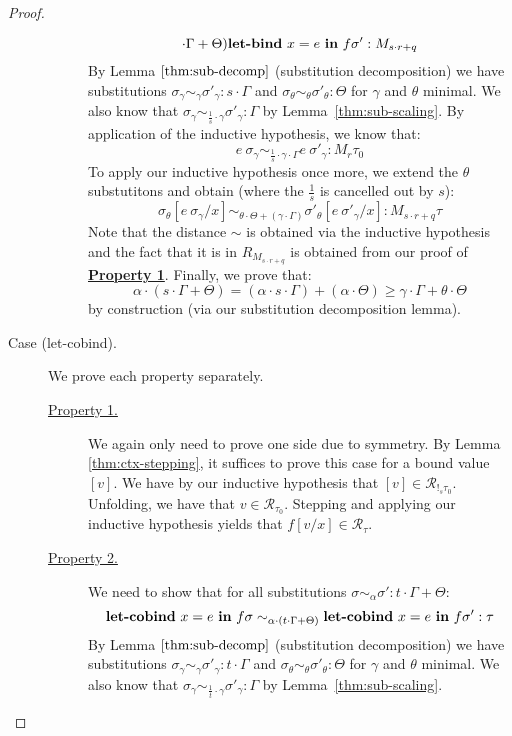 \begin{proof}
\begin{description}
\begin{description}
$${          \cdot \Gamma + \Theta)} \textbf{let-bind}~x = e \ \textbf{in} \ f \sigma' :
          M_{s \cdot r + q}$$
          By Lemma $\ref{thm:sub-decomp}$ (substitution decomposition) we have
          substitutions 
          $\sigma_{\gamma} \sim_{\gamma} \sigma'_{\gamma} : s \cdot \Gamma$
          and $\sigma_{\theta} \sim_{\theta} \sigma'_{\theta} : \Theta$ for
          $\gamma$ and $\theta$ minimal. 
          We also know that 
          $\sigma_{\gamma} \sim_{\frac{1}{s} \cdot \gamma} \sigma'_{\gamma} : \Gamma$ by
          Lemma~\ref{thm:sub-scaling}.
          By application of the inductive hypothesis, we know that:
          $$
          e~\sigma_{\gamma} \sim_{\frac{1}{s} \cdot \gamma \cdot \Gamma}
          e~\sigma'_{\gamma} : M_r \tau_0
          $$
          To apply our inductive hypothesis once more, we extend the $\theta$
          substutitons and obtain (where the $\frac{1}{s}$ is cancelled out by
          $s$):
          $$\sigma_{\theta}[e~\sigma_{\gamma}/x] \sim_{\theta \cdot \Theta + (\gamma \cdot \Gamma)}\sigma'_{\theta}[e~\sigma'_{\gamma}/x] : M_{s \cdot r + q} \tau$$
          Note that the distance $\sim$ is obtained via the inductive hypothesis
          and the fact that it is in $R_{M_{s \cdot r + q}}$ is obtained from
          our proof of \textbf{\underline{Property 1}}.
          Finally, we prove that:
          $$
          \alpha \cdot (s \cdot \Gamma + \Theta) = 
          (\alpha \cdot s \cdot \Gamma) + (\alpha \cdot \Theta)
          \geq
          \gamma \cdot \Gamma + \theta \cdot \Theta
          $$
          by construction (via our substitution decomposition lemma).
      \end{description}
    \item[Case (let-cobind).] 
      We prove each property separately.
      \begin{description}
        \item[\underline{Property 1.}]
          We again only need to prove one side due to symmetry.
          By Lemma \ref{thm:ctx-stepping}, it suffices to prove this case for a
          bound value $[v]$. 
          We have by our inductive hypothesis that $[v] \in \mathcal{R}_{!_s \tau_0}$.
          Unfolding, we have that $v \in \mathcal{R}_{\tau_0}$.
          Stepping and applying our inductive hypothesis yields that $f[v/x] \in
          \mathcal{R}_{\tau}$.
        \item[\underline{Property 2.}]
          We need to show that for all substitutions $\sigma \sim_{\alpha}
          \sigma' : t \cdot \Gamma + \Theta$:
          $$\textbf{let-cobind}~x = e \ \textbf{in} \ f \sigma \sim_{\alpha \cdot (t
          \cdot \Gamma + \Theta)} \textbf{let-cobind}~x = e \ \textbf{in} \ f \sigma' :
          \tau$$
          By Lemma $\ref{thm:sub-decomp}$ (substitution decomposition) we have
          substitutions 
          $\sigma_{\gamma} \sim_{\gamma} \sigma'_{\gamma} : t \cdot \Gamma$
          and $\sigma_{\theta} \sim_{\theta} \sigma'_{\theta} : \Theta$ for
          $\gamma$ and $\theta$ minimal. 
          We also know that 
          $\sigma_{\gamma} \sim_{\frac{1}{t} \cdot \gamma} \sigma'_{\gamma} : \Gamma$ by
          Lemma~\ref{thm:sub-scaling}.


\end{description}
\end{description}
\end{proof}
